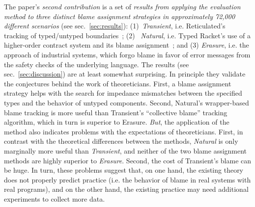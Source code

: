 The paper's {\it second contribution\/} is a set of {\em results from
applying the evaluation method to three distinct blame assignment
strategies in approximately 72,000 different scenarios\/} (see
sec.~\ref{sec:results}): (1)~{\it Transient\/}, i.e. Reticulated's
tracking of typed/untyped boundaries~\citep{vss-popl-2017}; (2)~{\it
Natural\/}, i.e. Typed Racket's use of a higher-order contract system and
its blame assignment~\citep{ff-icfp-2002}; and (3) {\it Erasure\/}, i.e.
the approach of industrial systems, which forgo blame in favor of error
messages from the safety checks of the underlying language. The results
(see sec.~\ref{sec:discussion}) are at least somewhat surprising.  In
principle they validate the conjectures behind the work of theoreticians.
First, a blame assignment strategy helps with the search for
impedance mismatches between the specified types and the behavior of
untyped components.  Second, Natural's wrapper-based blame tracking is
more useful than Transient's ``collective blame'' tracking algorithm,
which in turn is superior to Erasure. {\em But\/}, the application of the
method also indicates problems with the expectations of theoreticians. First,
in contrast with the theoretical differences between the methods,
{\it Natural\/} is only marginally more useful than {\it Transient\/}, and neither of the two
blame assignment methods are highly superior to {\it Erasure\/}.  Second,
the cost of Transient's blame can be huge.  In turn, these
problems suggest that, on one hand, the existing theory does not properly
predict practice (i.e. the behavior of blame in real systems with real programs),
and on the other hand, the existing practice may need
additional experiments to collect more data.
